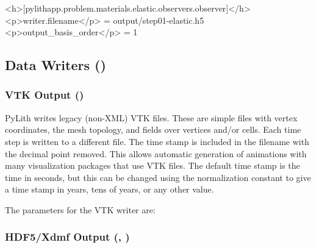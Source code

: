 \begin{cfg}
<h>[pylithapp.problem.materials.elastic.observers.observer]</h>
<p>writer.filename</p> = output/step01-elastic.h5
<p>output_basis_order</p> = 1
\end{cfg}

\subsection{Data Writers ()}

\subsubsection{VTK Output ()}

PyLith writes legacy (non-XML) VTK files. These are simple files with
vertex coordinates, the mesh topology, and fields over vertices and/or
cells. Each time step is written to a different file. The time stamp
is included in the filename with the decimal point removed. This allows
automatic generation of animations with many visualization packages
that use VTK files. The default time stamp is the time in seconds,
but this can be changed using the normalization constant to give a
time stamp in years, tens of years, or any other value.


The parameters for the VTK writer are:
\begin{inventory}
\end{inventory}


\subsubsection{HDF5/Xdmf Output (, )}
\label{sub:HDF5/Xdmf-Output}

